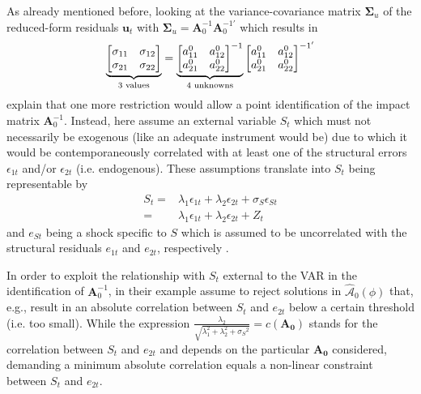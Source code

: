 \documentclass[a4paper,11pt,listof=nochaptergap,oneside,pointednumbers,bibtotoc,bigheadings,liststotoc,hidelinks]{scrbook}
\theoremstyle{mysatz}
\theoremstyle{mydefinition}
\theoremstyle{mytheorem}
\theoremstyle{mybemerkung}
\let\oldhat\hat
\newcommand{\vect}[1]{\boldsymbol{\mathbf{#1}}}
\newcommand{\hatt}[1]{\oldhat{\boldsymbol{\mathbf{#1}}}}
\begin{document}
As already mentioned before, looking at the variance-covariance matrix $\vect{\Sigma}_u$ of the reduced-form residuals $\vect{u}_t$ with $\vect{\Sigma}_u = \vect{A}_{0}^{-1} \vect{A}_{0}^{-1'}$ which results in 
$$		
		\underbrace{%
		\begin{bmatrix}
    		\sigma_{11} & \sigma_{12} \\
		\sigma_{21} & \sigma_{22}
 		\end{bmatrix}
}_{\text{3 values}} = \underbrace{%
		\begin{bmatrix}
    		a_{11}^0 & a_{12}^0 \\
		a_{21}^0 & a_{22}^0
 		\end{bmatrix}^{-1}
}_{\text{4 unknowns}}
\begin{bmatrix}
    		a_{11}^0 & a_{12}^0  \\
		a_{21}^0 & a_{22}^0
 		\end{bmatrix}^{{-1}'}$$
\citet{ludvigsonetal:17} explain that one more restriction would allow a point identification of the impact matrix $ \vect{A}_{0}^{-1}$. Instead, here \citet{ludvigsonetal:17} assume an external variable $S_t$ which must not necessarily be exogenous (like an adequate instrument would be) due to which it would be contemporaneously correlated with at least one of the structural errors $\epsilon_{1t}$ and/or $\epsilon_{2t}$ (i.e. endogenous). These assumptions translate into $S_t$ being representable by 
	\begin{equation} \label{eq:svar_ludvig1}
		\begin{split}
	S_t =&  \lambda_1 \epsilon_{1t} + \lambda_2 \epsilon_{2t} + \sigma_S \epsilon_{St} \\
	     = & 	\lambda_1 \epsilon_{1t} + \lambda_2 \epsilon_{2t} + Z_t		
	     	\end{split}				
	\end{equation}	
and $e_{St}$ being a shock specific to $S$ which is assumed to be uncorrelated with the structural residuals $e_{1t}$ and $e_{2t}$, respectively \citep{ludvigsonetal:17}. 

In order to exploit the relationship with $S_t$ external to the VAR in the identification of $ \vect{A}_{0}^{-1}$, in their example \citet{ludvigsonetal:17} assume to reject solutions in $\hatt{\mathcal{A}}_0(\phi)$ that, e.g., result in an absolute correlation between $S_t$ and $e_{2t}$ below a certain threshold (i.e. too small). While the expression $\frac{\lambda_2}{\sqrt{\lambda_{1}^2 + \lambda_{2}^2 + \sigma_S{^2}}} = c(\vect{A_0})$ stands for the correlation between $S_t$ and $e_{2t}$ and depends on the particular $\vect{A_0}$ considered, demanding a minimum absolute correlation equals a non-linear constraint between $S_t$ and $e_{2t}$.\\
\end{document}
